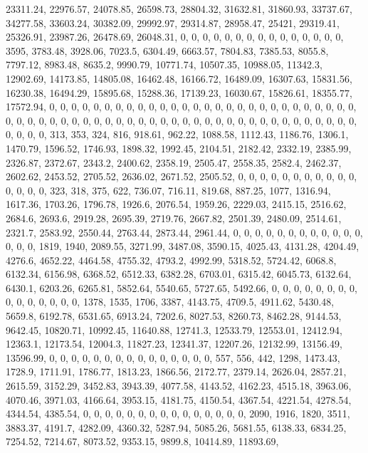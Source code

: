 \documentclass[
]{article}
\begin{document}
23311.24, 22976.57, 24078.85, 26598.73, 28804.32, 31632.81, 31860.93,
33737.67, 34277.58, 33603.24, 30382.09, 29992.97, 29314.87, 28958.47,
25421, 29319.41, 25326.91, 23987.26, 26478.69, 26048.31, 0, 0, 0, 0, 0,
0, 0, 0, 0, 0, 0, 0, 0, 0, 0, 3595, 3783.48, 3928.06, 7023.5, 6304.49,
6663.57, 7804.83, 7385.53, 8055.8, 7797.12, 8983.48, 8635.2, 9990.79,
10771.74, 10507.35, 10988.05, 11342.3, 12902.69, 14173.85, 14805.08,
16462.48, 16166.72, 16489.09, 16307.63, 15831.56, 16230.38, 16494.29,
15895.68, 15288.36, 17139.23, 16030.67, 15826.61, 18355.77, 17572.94, 0,
0, 0, 0, 0, 0, 0, 0, 0, 0, 0, 0, 0, 0, 0, 0, 0, 0, 0, 0, 0, 0, 0, 0, 0,
0, 0, 0, 0, 0, 0, 0, 0, 0, 0, 0, 0, 0, 0, 0, 0, 0, 0, 0, 0, 0, 0, 0, 0,
0, 0, 0, 0, 0, 0, 0, 0, 0, 0, 0, 0, 0, 0, 0, 313, 353, 324, 816, 918.61,
962.22, 1088.58, 1112.43, 1186.76, 1306.1, 1470.79, 1596.52, 1746.93,
1898.32, 1992.45, 2104.51, 2182.42, 2332.19, 2385.99, 2326.87, 2372.67,
2343.2, 2400.62, 2358.19, 2505.47, 2558.35, 2582.4, 2462.37, 2602.62,
2453.52, 2705.52, 2636.02, 2671.52, 2505.52, 0, 0, 0, 0, 0, 0, 0, 0, 0,
0, 0, 0, 0, 0, 0, 323, 318, 375, 622, 736.07, 716.11, 819.68, 887.25,
1077, 1316.94, 1617.36, 1703.26, 1796.78, 1926.6, 2076.54, 1959.26,
2229.03, 2415.15, 2516.62, 2684.6, 2693.6, 2919.28, 2695.39, 2719.76,
2667.82, 2501.39, 2480.09, 2514.61, 2321.7, 2583.92, 2550.44, 2763.44,
2873.44, 2961.44, 0, 0, 0, 0, 0, 0, 0, 0, 0, 0, 0, 0, 0, 0, 0, 1819,
1940, 2089.55, 3271.99, 3487.08, 3590.15, 4025.43, 4131.28, 4204.49,
4276.6, 4652.22, 4464.58, 4755.32, 4793.2, 4992.99, 5318.52, 5724.42,
6068.8, 6132.34, 6156.98, 6368.52, 6512.33, 6382.28, 6703.01, 6315.42,
6045.73, 6132.64, 6430.1, 6203.26, 6265.81, 5852.64, 5540.65, 5727.65,
5492.66, 0, 0, 0, 0, 0, 0, 0, 0, 0, 0, 0, 0, 0, 0, 0, 1378, 1535, 1706,
3387, 4143.75, 4709.5, 4911.62, 5430.48, 5659.8, 6192.78, 6531.65,
6913.24, 7202.6, 8027.53, 8260.73, 8462.28, 9144.53, 9642.45, 10820.71,
10992.45, 11640.88, 12741.3, 12533.79, 12553.01, 12412.94, 12363.1,
12173.54, 12004.3, 11827.23, 12341.37, 12207.26, 12132.99, 13156.49,
13596.99, 0, 0, 0, 0, 0, 0, 0, 0, 0, 0, 0, 0, 0, 0, 0, 557, 556, 442,
1298, 1473.43, 1728.9, 1711.91, 1786.77, 1813.23, 1866.56, 2172.77,
2379.14, 2626.04, 2857.21, 2615.59, 3152.29, 3452.83, 3943.39, 4077.58,
4143.52, 4162.23, 4515.18, 3963.06, 4070.46, 3971.03, 4166.64, 3953.15,
4181.75, 4150.54, 4367.54, 4221.54, 4278.54, 4344.54, 4385.54, 0, 0, 0,
0, 0, 0, 0, 0, 0, 0, 0, 0, 0, 0, 0, 2090, 1916, 1820, 3511, 3883.37,
4191.7, 4282.09, 4360.32, 5287.94, 5085.26, 5681.55, 6138.33, 6834.25,
7254.52, 7214.67, 8073.52, 9353.15, 9899.8, 10414.89, 11893.69,
\end{document}
